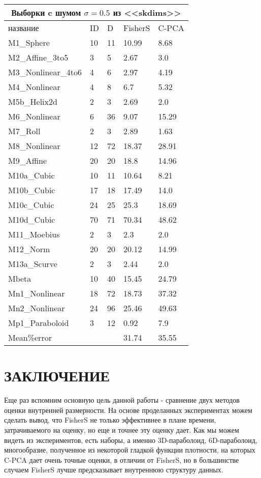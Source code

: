 \documentclass[english, russian]{sobraep}
\begin{document}
\begin{tabular}{
p{2.4cm}|p{0.9cm}|p{0.9cm}|p{0.9cm}|p{0.9cm}}
 \hline
 \multicolumn{5}{c}{Выборки c шумом $\sigma = 0.5$ из <<skdims>>} \\
 \hline
 название & ID & D & FisherS& C-PCA\\
 \hline
M1_Sphere   & 10 & 11 & 10.99 & 8.68\\
M2_Affine_3to5   & 3 & 5 & 2.67 & 3.0\\
M3_Nonlinear_4to6   & 4 & 6 & 2.97 & 4.19\\
M4_Nonlinear   & 4 & 8 & 6.7 & 5.32\\
M5b_Helix2d   & 2 & 3 & 2.69 & 2.0\\
M6_Nonlinear   & 6 & 36 & 9.07 & 15.29\\
M7_Roll   & 2 & 3 & 2.89 & 1.63\\
M8_Nonlinear   & 12 & 72 & 18.37 & 28.91\\
M9_Affine   & 20 & 20 & 18.8 & 14.96\\
M10a_Cubic   & 10 & 11 & 10.64 & 8.21\\
M10b_Cubic   & 17 & 18 & 17.49 & 14.0\\
M10c_Cubic   & 24 & 25 & 25.3 & 18.69\\
M10d_Cubic   & 70 & 71 & 70.34 & 48.62\\
M11_Moebius   & 2 & 3 & 2.3 & 2.0\\
M12_Norm   & 20 & 20 & 20.12 & 14.99\\
M13a_Scurve   & 2 & 3 & 2.44 & 2.0\\
Mbeta   & 10 & 40 & 15.45 & 24.79\\
Mn1_Nonlinear   & 18 & 72 & 18.73 & 37.32\\
Mn2_Nonlinear   & 24 & 96 & 25.46 & 49.63\\
Mp1_Paraboloid   & 3 & 12 & 0.92 & 7.9\\
\hline
Mean\%error & & & 31.74 & 35.55\\
 \hline
 
\end{tabular}
    
\section{ЗАКЛЮЧЕНИЕ}
Еще раз вспомним основную цель данной работы - сравнение двух методов оценки внутренней размерности. На основе проделанных экспериментах можем сделать вывод, что FisherS не только эффективнее в плане времени, затрачиваемого на оценку, но еще и точнее эту оценку дает. Как мы можем видеть из экспериментов, есть наборы, а именно 3D-параболоид, 6D-параболоид, многообразие, полученное из некоторой гладкой функции плотности, на которых C-PCA дает очень точные оценки, в отличии от FisherS, но в большинстве случаем FisherS лучше предсказывает внутреннюю структуру данных. 
\end{document}
